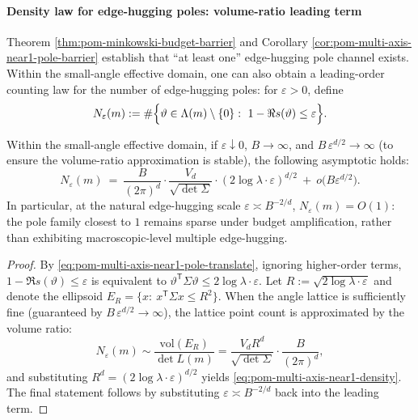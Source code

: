 \paragraph{Density law for edge-hugging poles: volume-ratio leading term}
Theorem \ref{thm:pom-minkowski-budget-barrier} and Corollary \ref{cor:pom-multi-axis-near1-pole-barrier} establish that ``at least one'' edge-hugging pole channel exists.
Within the small-angle effective domain, one can also obtain a leading-order counting law for the number of edge-hugging poles: for \(\varepsilon>0\), define
\[
N_\varepsilon(m):=\#\Bigl\{\vartheta\in \Lambda(m)\setminus\{0\}:\ 1-\Re s(\vartheta)\le \varepsilon\Bigr\}.
\]

\begin{proposition}\label{prop:pom-multi-axis-near1-density}
Within the small-angle effective domain, if \(\varepsilon\downarrow 0\), \(B\to\infty\), and \(B\,\varepsilon^{d/2}\to\infty\) (to ensure the volume-ratio approximation is stable), the following asymptotic holds:
\begin{equation}\label{eq:pom-multi-axis-near1-density}
N_{\varepsilon}(m)
\ =\
\frac{B}{(2\pi)^{d}}\cdot\frac{V_{d}}{\sqrt{\det\Sigma}}\cdot(2\log\lambda\cdot\varepsilon)^{d/2}
\ +\ o\!\bigl(B\varepsilon^{d/2}\bigr).
\end{equation}
In particular, at the natural edge-hugging scale \(\varepsilon\asymp B^{-2/d}\), \(N_\varepsilon(m)=O(1)\): the pole family closest to \(1\) remains sparse under budget amplification, rather than exhibiting macroscopic-level multiple edge-hugging.
\end{proposition}

\begin{proof}
By \eqref{eq:pom-multi-axis-near1-pole-translate}, ignoring higher-order terms,
\(
1-\Re s(\vartheta)\le \varepsilon
\)
is equivalent to
\(
\vartheta^{\mathsf T}\Sigma\vartheta\le 2\log\lambda\cdot\varepsilon
\).
Let \(R:=\sqrt{2\log\lambda\cdot\varepsilon}\) and denote the ellipsoid \(E_R=\{x:\ x^{\mathsf T}\Sigma x\le R^2\}\).
When the angle lattice is sufficiently fine (guaranteed by \(B\,\varepsilon^{d/2}\to\infty\)), the lattice point count is approximated by the volume ratio:
\[
N_\varepsilon(m)
\sim
\frac{\mathrm{vol}(E_R)}{\det L(m)}
=\frac{V_d R^d}{\sqrt{\det\Sigma}}\cdot\frac{B}{(2\pi)^d},
\]
and substituting \(R^d=(2\log\lambda\cdot\varepsilon)^{d/2}\) yields \eqref{eq:pom-multi-axis-near1-density}.
The final statement follows by substituting \(\varepsilon\asymp B^{-2/d}\) back into the leading term.
\end{proof}

